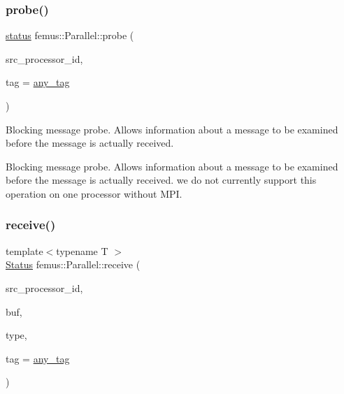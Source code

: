 \mbox{\label{namespacefemus_1_1_parallel_a3799e1e93384e926d91a6cba47d61bb2}} 
\subsubsection{\texorpdfstring{probe()}{probe()}}
{\footnotesize\ttfamily \mbox{\hyperlink{structfemus_1_1_parallel_1_1status}{status}} femus\+::\+Parallel\+::probe (\begin{DoxyParamCaption}\item[{const int}]{src\+\_\+processor\+\_\+id,  }\item[{const int}]{tag = {\ttfamily \mbox{\hyperlink{namespacefemus_1_1_parallel_a928996065f46cb52e89e132cdcb30328}{any\+\_\+tag}}} }\end{DoxyParamCaption})\hspace{0.3cm}{\ttfamily [inline]}}

Blocking message probe. Allows information about a message to be examined before the message is actually received.

Blocking message probe. Allows information about a message to be examined before the message is actually received. we do not currently support this operation on one processor without M\+PI. \mbox{\label{namespacefemus_1_1_parallel_a308546b3fc2d590d954da95d8f9e089c}} 
\subsubsection{\texorpdfstring{receive()}{receive()}\hspace{0.1cm}{\footnotesize\ttfamily [1/4]}}
{\footnotesize\ttfamily template$<$typename T $>$ \\
\mbox{\hyperlink{classfemus_1_1_parallel_1_1_status}{Status}} femus\+::\+Parallel\+::receive (\begin{DoxyParamCaption}\item[{const int}]{src\+\_\+processor\+\_\+id,  }\item[{std\+::vector$<$ T $>$ \&}]{buf,  }\item[{const \mbox{\hyperlink{classfemus_1_1_parallel_1_1_data_type}{Data\+Type}} \&}]{type,  }\item[{const int}]{tag = {\ttfamily \mbox{\hyperlink{namespacefemus_1_1_parallel_a928996065f46cb52e89e132cdcb30328}{any\+\_\+tag}}} }\end{DoxyParamCaption})\hspace{0.3cm}{\ttfamily [inline]}}

